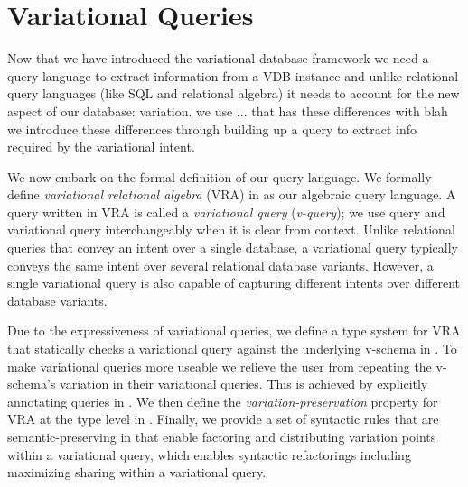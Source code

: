 \chapter{Variational Queries}
\label{ch:vql}

Now that we have introduced the variational database framework 
we need a query language to extract information from a VDB instance
and unlike relational query languages (like SQL and relational algebra)
it needs to account for the new aspect of our database: variation. 
%
we use ... that has these differences with blah
%
we introduce these differences through building up a query to extract info
required by the variational intent. 

We now embark on the formal definition of our query language. 
We formally define 
\emph{variational relational algebra} (VRA) in 
as our algebraic query language.
A query written in VRA is called a \emph{variational query} (\emph{v-query});
we use query and variational query interchangeably when it is clear from context. 
Unlike relational queries that convey an intent over a single database, 
a variational query typically conveys the same intent over several 
relational database variants. However, a single variational query is also capable of capturing different 
intents over different database variants.

Due to the expressiveness of variational queries, we define a type system for VRA that statically checks a
variational query against the underlying v-schema in .
%
To make variational queries more useable we relieve the user from repeating 
the v-schema's variation in their variational queries. This is achieved by 
explicitly annotating queries in .
We then define the \emph{variation-preservation} property for VRA at
the type level in .
%
Finally, we provide 
a set of syntactic rules that are semantic-preserving 
in  that enable factoring and distributing
variation points within a variational query, which enables syntactic refactorings
including maximizing sharing within a variational query.

%
%


%


%



